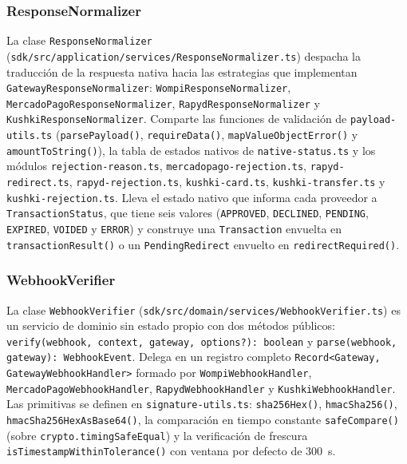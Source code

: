 \subsubsection{ResponseNormalizer}
La clase \texttt{Response\allowbreak{}Normalizer} (\texttt{sdk/\allowbreak{}src/\allowbreak{}application/\allowbreak{}services/\allowbreak{}Response\allowbreak{}Normalizer.ts}) despacha la traducción de la respuesta nativa hacia las estrategias que implementan \texttt{Gateway\allowbreak{}Response\allowbreak{}Normalizer}: \texttt{Wompi\allowbreak{}Response\allowbreak{}Normalizer}, \texttt{Mercado\allowbreak{}Pago\allowbreak{}Response\allowbreak{}Normalizer}, \texttt{Rapyd\allowbreak{}Response\allowbreak{}Normalizer} y \texttt{Kushki\allowbreak{}Response\allowbreak{}Normalizer}. Comparte las funciones de validación de \texttt{payload-\allowbreak{}utils.ts} (\texttt{parsePayload()}, \texttt{requireData()}, \texttt{map\allowbreak{}Value\allowbreak{}Object\allowbreak{}Error()} y \texttt{amountToString()}), la tabla de estados nativos de \texttt{native-\allowbreak{}status.ts} y los módulos \texttt{rejection-\allowbreak{}reason.ts}, \texttt{mercadopago-\allowbreak{}rejection.ts}, \texttt{rapyd-\allowbreak{}redirect.ts}, \texttt{rapyd-\allowbreak{}rejection.ts}, \texttt{kushki-\allowbreak{}card.ts}, \texttt{kushki-\allowbreak{}transfer.ts} y \texttt{kushki-\allowbreak{}rejection.ts}. Lleva el estado nativo que informa cada proveedor a \texttt{Transaction\allowbreak{}Status}, que tiene seis valores (\texttt{APPROVED}, \texttt{DECLINED}, \texttt{PENDING}, \texttt{EXPIRED}, \texttt{VOIDED} y \texttt{ERROR}) y construye una \texttt{Transaction} envuelta en \texttt{transaction\allowbreak{}Result()} o un \texttt{Pending\allowbreak{}Redirect} envuelto en \texttt{redirect\allowbreak{}Required()}.

\subsubsection{WebhookVerifier}
La clase \texttt{Webhook\allowbreak{}Verifier} (\texttt{sdk/\allowbreak{}src/\allowbreak{}domain/\allowbreak{}services/\allowbreak{}Webhook\allowbreak{}Verifier.ts}) es un servicio de dominio sin estado propio con dos métodos públicos: \texttt{verify(\allowbreak{}webhook, context, gateway, options?): boolean} y \texttt{parse(\allowbreak{}webhook, gateway): WebhookEvent}. Delega en un registro completo \texttt{Record<\allowbreak{}Gateway, Gateway\allowbreak{}Webhook\allowbreak{}Handler>} formado por \texttt{Wompi\allowbreak{}Webhook\allowbreak{}Handler}, \texttt{Mercado\allowbreak{}Pago\allowbreak{}Webhook\allowbreak{}Handler}, \texttt{Rapyd\allowbreak{}Webhook\allowbreak{}Handler} y \texttt{Kushki\allowbreak{}Webhook\allowbreak{}Handler}. Las primitivas se definen en \texttt{signature-\allowbreak{}utils.ts}: \texttt{sha256Hex()}, \texttt{hmacSha256()}, \texttt{hmacSha256HexAsBase64()}, la comparación en tiempo constante \texttt{safeCompare()} (sobre \texttt{crypto.\allowbreak{}timing\allowbreak{}Safe\allowbreak{}Equal}) y la verificación de frescura \texttt{is\allowbreak{}Timestamp\allowbreak{}Within\allowbreak{}Tolerance()} con ventana por defecto de 300~s.


